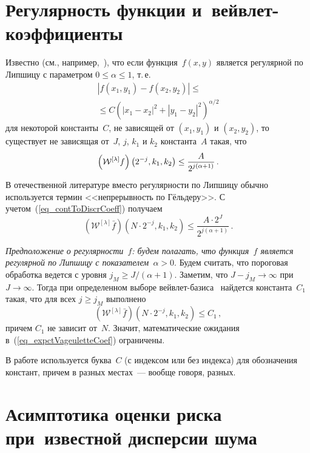 \begin{multicols}{2}
\section{Регулярность функции и~вейвлет-коэффициенты}\label{sect_RegularityTomo}

Известно (см., например,~\cite{Mallat}), что если функция~$f(x,y)$ является регулярной по Липшицу 
с параметром $0\leq\alpha\leq 1$, т.\,е.\
\begin{multline*}
\left|f(x_1,y_1)-f(x_2,y_2)\right|\leq{}\\
{}\leq C \left( |x_1-x_2|^2 + |y_1-y_2|^2 \right)^{\alpha/2}
\end{multline*}
для некоторой константы~$C$, не зависящей от $(x_1,y_1)$ и $(x_2,y_2)$, то существует не зависящая от~$J$, 
$j$, $k_1$ и $k_2$ константа~$A$ такая, что
\begin{equation*}
\left(\mathcal{W}^{[\lambda]}f\right)\left(2^{-j},k_1,k_2\right)\leq \displaystyle\frac{\displaystyle A\mathstrut}{\displaystyle 2^{j(\alpha+1)}\mathstrut}\,.
\end{equation*}
В отечественной литературе вместо регулярности по Липшицу обычно используется термин <<непрерывность 
по Гёльдеру>>.
С учетом~(\ref{eq_contToDiscrCoeff}) получаем
\begin{equation*}
\left(\mathcal{W}^{[\lambda]}\bar f\right)\left(N\cdot 2^{-j},k_1,k_2\right) \leqslant \frac{A\cdot 2^J}{2^{j(\alpha+1)}}\,.
\end{equation*}

\textit{Предположение о регулярности~$f$: будем полагать, что функция~$f$ является регулярной по Липшицу с 
показателем~$\alpha>0$}. Будем считать, что пороговая обработка ведется с уровня 
$j_M\geq J/(\alpha+1)$. Заметим, что $J-j_M\rightarrow\infty$ при $J\rightarrow\infty$. 
Тогда при определенном выборе вейвлет-базиса~\cite{Mallat} найдется константа~$C_1$ такая, что для 
всех $j\geq j_M$ выполнено
\begin{equation}
\label{eq_WaveletCoeffUpperBoundTomo}
\left(\mathcal{W}^{[\lambda]}\bar f\right)\left(N\cdot 2^{-j},k_1,k_2\right) \leqslant C_1\,,
\end{equation}
причем $C_1$ не зависит от~$N$. Значит, математические ожидания в~(\ref{eq_expctVageuletteCoef}) ограничены.

В работе используется буква~$C$ (с индексом или без индекса) для обозначения констант, причем в 
разных местах~--- вообще говоря, разных.

\section{Асимптотика оценки риска при~известной дисперсии шума}\label{sect_ConsitKnownSTomo}


\end{multicols}
